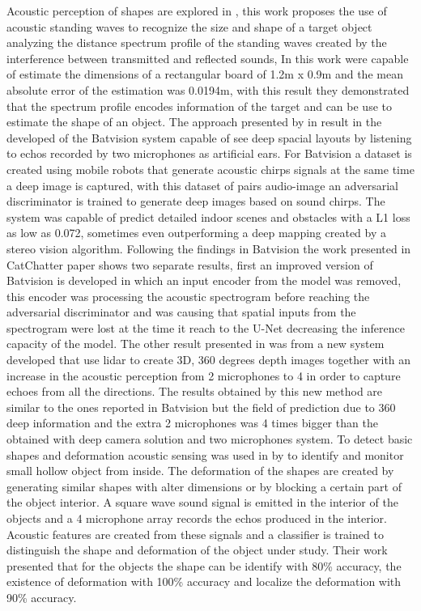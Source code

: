 Acoustic perception of shapes are explored in \cite{shape1}, this work proposes the use of acoustic standing waves to recognize the size and shape of a target object analyzing the distance spectrum profile of the standing waves created by the interference between transmitted and reflected sounds, In this work \citeauthor{shape1} were capable of estimate the dimensions of a rectangular board of 1.2m x 0.9m and the mean absolute error of the estimation was 0.0194m, with this result they demonstrated that the spectrum profile encodes information of the target and can be use to estimate the shape of an object. The approach presented by \citeauthor{bat1} in \cite{bat1} result in the developed of the Batvision system capable of see deep spacial layouts by listening to echos recorded by two microphones as artificial ears. For Batvision a dataset is created using mobile robots that generate acoustic chirps signals at the same time a deep image is captured, with this dataset of pairs audio-image an adversarial discriminator is trained to generate deep images based on sound chirps. The system was capable of predict detailed indoor scenes and obstacles with a L1 loss as low as 0.072, sometimes even outperforming a deep mapping created by a stereo vision algorithm. Following the findings in Batvision the work presented in CatChatter paper \cite{cat1} shows two separate results, first an improved version of Batvision is developed in which an input encoder from the model was removed, this encoder was processing the acoustic spectrogram before reaching the adversarial discriminator and was causing that spatial inputs from the spectrogram were lost at the time it reach to the U-Net decreasing the inference capacity of the model. The other result presented in \cite{cat1} was from a new system developed that use lidar to create 3D, 360 degrees depth images together with an increase in the acoustic perception from 2 microphones to 4 in order to capture echoes from all the directions. The results obtained by this new method are similar to the ones reported in Batvision \cite{bat1} but the field of prediction due to 360 deep information and the extra 2 microphones was 4 times bigger than the obtained with deep camera solution and two microphones system. To detect basic shapes and deformation acoustic sensing was used in \cite{echosense} by \citeauthor{echosense} to identify and monitor small hollow object from inside. The deformation of the shapes are created by generating similar shapes with alter dimensions or by blocking a certain part of the object interior. A square wave sound signal is emitted in the interior of the objects and a 4 microphone array records the echos produced in the interior. Acoustic features are created from these signals and a classifier is trained to distinguish the shape and deformation of the object under study. Their work presented that for the objects the shape can be identify with 80\% accuracy, the existence of deformation with 100\% accuracy and localize the deformation with 90\% accuracy.        



